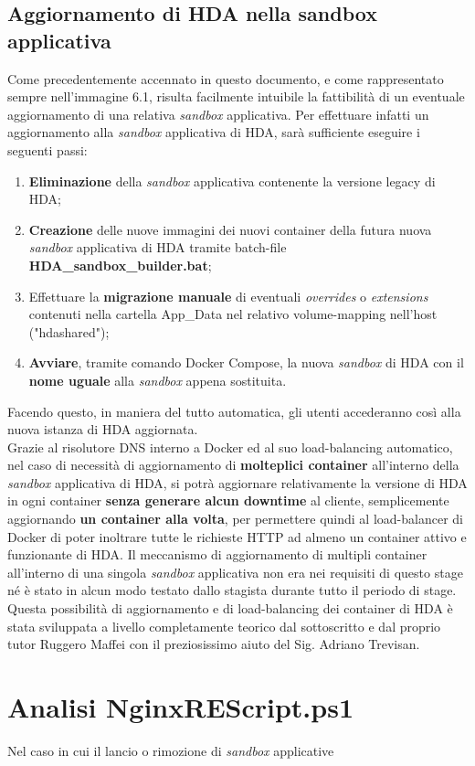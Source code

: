 \subsection{Aggiornamento di HDA nella sandbox applicativa}
Come precedentemente accennato in questo documento, e come rappresentato sempre nell'immagine 6.1, risulta facilmente intuibile la fattibilità di un eventuale aggiornamento di una relativa \textit{sandbox} applicativa. Per effettuare infatti un aggiornamento alla \textit{sandbox} applicativa di HDA, sarà sufficiente eseguire i seguenti passi:
\begin{enumerate}
	\item \textbf{Eliminazione} della \textit{sandbox} applicativa contenente la versione legacy di HDA;
	\item \textbf{Creazione} delle nuove immagini dei nuovi container della futura nuova \textit{sandbox} applicativa di HDA tramite batch-file \textbf{HDA\_sandbox\_builder.bat};
	\item Effettuare la \textbf{migrazione manuale} di eventuali \textit{overrides} o \textit{extensions} contenuti nella cartella App\_Data nel relativo volume-mapping nell'host ("hdashared");
	\item \textbf{Avviare}, tramite comando Docker Compose, la nuova \textit{sandbox} di HDA con il \textbf{nome uguale} alla \textit{sandbox} appena sostituita.
\end{enumerate}

Facendo questo, in maniera del tutto automatica, gli utenti accederanno così alla nuova istanza di HDA aggiornata.\\

Grazie al risolutore DNS interno a Docker ed al suo load-balancing automatico, nel caso di necessità di aggiornamento di \textbf{molteplici container} all'interno della \textit{sandbox} applicativa di HDA, si potrà aggiornare relativamente la versione di HDA in ogni container \textbf{senza generare alcun downtime} al cliente, semplicemente aggiornando \textbf{un container alla volta}, per permettere quindi al load-balancer di Docker di poter inoltrare tutte le richieste HTTP ad almeno un container attivo e funzionante di HDA. Il meccanismo di aggiornamento di multipli container all'interno di una singola \textit{sandbox} applicativa non era nei requisiti di questo stage né è stato in alcun modo testato dallo stagista durante tutto il periodo di stage. Questa possibilità di aggiornamento e di load-balancing dei container di HDA è stata sviluppata a livello completamente teorico dal sottoscritto e dal proprio tutor Ruggero Maffei con il preziosissimo aiuto del Sig. Adriano Trevisan.

\section{Analisi NginxREScript.ps1}
Nel caso in cui il lancio o rimozione di \textit{sandbox} applicative 
